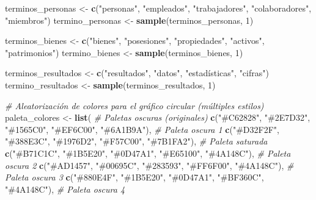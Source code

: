 \documentclass[
]{article}
\newenvironment{Shaded}{\begin{snugshade}}{\end{snugshade}}
\newcommand{\CommentTok}[1]{\textcolor[rgb]{0.56,0.35,0.01}{\textit{#1}}}
\newcommand{\DecValTok}[1]{\textcolor[rgb]{0.00,0.00,0.81}{#1}}
\newcommand{\FunctionTok}[1]{\textcolor[rgb]{0.13,0.29,0.53}{\textbf{#1}}}
\newcommand{\NormalTok}[1]{#1}
\newcommand{\OtherTok}[1]{\textcolor[rgb]{0.56,0.35,0.01}{#1}}
\newcommand{\StringTok}[1]{\textcolor[rgb]{0.31,0.60,0.02}{#1}}
\begin{document}
\begin{Shaded}
\begin{Highlighting}[]
\NormalTok{terminos\_personas }\OtherTok{\textless{}{-}} \FunctionTok{c}\NormalTok{(}\StringTok{"personas"}\NormalTok{, }\StringTok{"empleados"}\NormalTok{, }\StringTok{"trabajadores"}\NormalTok{, }\StringTok{"colaboradores"}\NormalTok{, }\StringTok{"miembros"}\NormalTok{)}
\NormalTok{termino\_personas }\OtherTok{\textless{}{-}} \FunctionTok{sample}\NormalTok{(terminos\_personas, }\DecValTok{1}\NormalTok{)}

\NormalTok{terminos\_bienes }\OtherTok{\textless{}{-}} \FunctionTok{c}\NormalTok{(}\StringTok{"bienes"}\NormalTok{, }\StringTok{"posesiones"}\NormalTok{, }\StringTok{"propiedades"}\NormalTok{, }\StringTok{"activos"}\NormalTok{, }\StringTok{"patrimonios"}\NormalTok{)}
\NormalTok{termino\_bienes }\OtherTok{\textless{}{-}} \FunctionTok{sample}\NormalTok{(terminos\_bienes, }\DecValTok{1}\NormalTok{)}

\NormalTok{terminos\_resultados }\OtherTok{\textless{}{-}} \FunctionTok{c}\NormalTok{(}\StringTok{"resultados"}\NormalTok{, }\StringTok{"datos"}\NormalTok{, }\StringTok{"estadísticas"}\NormalTok{, }\StringTok{"cifras"}\NormalTok{)}
\NormalTok{termino\_resultados }\OtherTok{\textless{}{-}} \FunctionTok{sample}\NormalTok{(terminos\_resultados, }\DecValTok{1}\NormalTok{)}

\CommentTok{\# Aleatorización de colores para el gráfico circular (múltiples estilos)}
\NormalTok{paleta\_colores }\OtherTok{\textless{}{-}} \FunctionTok{list}\NormalTok{(}
  \CommentTok{\# Paletas oscuras (originales)}
  \FunctionTok{c}\NormalTok{(}\StringTok{"\#C62828"}\NormalTok{, }\StringTok{"\#2E7D32"}\NormalTok{, }\StringTok{"\#1565C0"}\NormalTok{, }\StringTok{"\#EF6C00"}\NormalTok{, }\StringTok{"\#6A1B9A"}\NormalTok{),  }\CommentTok{\# Paleta oscura 1}
  \FunctionTok{c}\NormalTok{(}\StringTok{"\#D32F2F"}\NormalTok{, }\StringTok{"\#388E3C"}\NormalTok{, }\StringTok{"\#1976D2"}\NormalTok{, }\StringTok{"\#F57C00"}\NormalTok{, }\StringTok{"\#7B1FA2"}\NormalTok{),  }\CommentTok{\# Paleta saturada}
  \FunctionTok{c}\NormalTok{(}\StringTok{"\#B71C1C"}\NormalTok{, }\StringTok{"\#1B5E20"}\NormalTok{, }\StringTok{"\#0D47A1"}\NormalTok{, }\StringTok{"\#E65100"}\NormalTok{, }\StringTok{"\#4A148C"}\NormalTok{),  }\CommentTok{\# Paleta oscura 2}
  \FunctionTok{c}\NormalTok{(}\StringTok{"\#AD1457"}\NormalTok{, }\StringTok{"\#00695C"}\NormalTok{, }\StringTok{"\#283593"}\NormalTok{, }\StringTok{"\#FF6F00"}\NormalTok{, }\StringTok{"\#4A148C"}\NormalTok{),  }\CommentTok{\# Paleta oscura 3}
  \FunctionTok{c}\NormalTok{(}\StringTok{"\#880E4F"}\NormalTok{, }\StringTok{"\#1B5E20"}\NormalTok{, }\StringTok{"\#0D47A1"}\NormalTok{, }\StringTok{"\#BF360C"}\NormalTok{, }\StringTok{"\#4A148C"}\NormalTok{),  }\CommentTok{\# Paleta oscura 4}


\end{Highlighting}
\end{Shaded}
\end{document}
